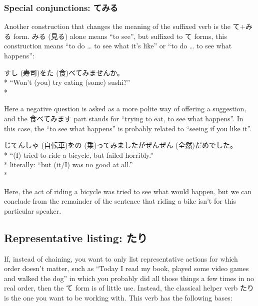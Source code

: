 \documentclass[11pt, b5paper, twoside, openright, onecolumn]{book}
\makeatletter
\newcommand*{\rubystack}[2]{{\relscale{0.5}%
  \begin{tabular}[b]{@{}c@{}}%
    {#1}\\%
   {\textscale{2}{#2}}%
  \end{tabular}}%
}
\DeclareRobustCommand*{\ruby}[2]{%
  \mbox{%
    \setlength{\parskip}{0ex}%
    \BeginAccSupp{method=pdfstringdef,ActualText={#1}}%
      \rubystack{\phantom{#2}}{#1}%
      \llap{%
        \rubystack{#2}{\phantom{#1}}%
      }%
    \EndAccSupp{}%
  }%
}
\renewcommand*{\ruby}[2]{#2 (#1)}%
\newenvironment{exampleblock}{
\setlength{\parindent}{0.6in}
\begin{minipage}[t]{\dimexpr\textwidth-\parindent}}
{\end{minipage}}
\makeatother
\begin{document}
\subsubsection{Special conjunctions: てみる}


Another construction that changes the meaning of the suffixed verb is the て+みる form. みる (見る) alone means “to see”‚ but suffixed to て forms‚ this construction means “to do … to see what it’s like” or “to do … to see what happens”:

\vspace{0.4cm}
\begin{exampleblock}
\ruby{寿司}{すし}を\ruby{食}{た}べてみませんか。 \\* 
“Won’t (you) try eating (some) sushi?” \\* 
\end{exampleblock}
\vspace{0.2cm}

Here a negative question is asked as a more polite way of offering a suggestion‚ and the 食べてみます part stands for “trying to eat‚ to see what happens”. In this case‚ the “to see what happens” is probably related to “seeing if you like it”.

\vspace{0.4cm}
\begin{exampleblock}
\ruby{自転車}{じてんしゃ}を\ruby{乗}{の}ってみましたが\ruby{全然}{ぜんぜん}だめでした。 \\* 
“(I) tried to ride a bicycle‚ but failed horribly.” \\* 
literally: “but (it/I) was no good at all.” \\* 
\end{exampleblock}
\vspace{0.2cm}

Here‚ the act of riding a bicycle was tried to see what would happen‚ but we can conclude from the remainder of the sentence that riding a bike isn’t for this particular speaker.

\subsection{Representative listing: たり}

If‚ instead of chaining‚ you want to only list representative actions for which order doesn’t matter‚ such as “Today I read my book‚ played some video games and walked the dog” in which you probably did all those things a few times in no real order‚ then the て form is of little use. Instead‚ the classical helper verb たり is the one you want to be working with. This verb has the following bases:
\end{document}

